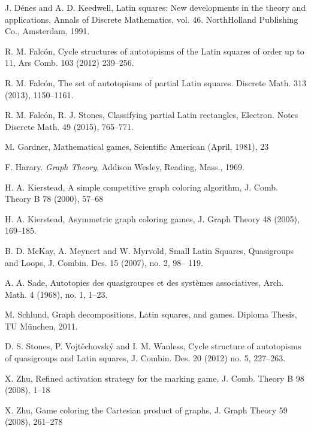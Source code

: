 \documentclass{article}
\begin{document}
\begin{thebibliography}{00}
 J. D{\'e}nes and A. D. Keedwell, Latin squares: New developments in the theory and applications, Annals of Discrete Mathematics, vol. 46. NorthHolland Publishing Co., Amsterdam, 1991.

 R. M. Falc\'on, Cycle structures of autotopisms of the Latin squares of order up to 11, Ars Comb. 103 (2012) 239--256.

 R. M. Falc\'on, The set of autotopisms of partial Latin squares. Discrete Math. 313 (2013), 1150--1161.

 R. M. Falc\'on, R. J. Stones, Classifying partial Latin rectangles, Electron. Notes Discrete Math. 49 (2015), 765--771.

 M. Gardner, Mathematical games, Scientific American (April, 1981), 23

 F. Harary. {\em Graph Theory}, Addison Wesley, Reading, Mass., 1969.

 H. A.  Kierstead, A  simple  competitive  graph  coloring  algorithm, J. Comb. Theory B 78 (2000), 57--68

 H. A. Kierstead, Asymmetric graph coloring games, J. Graph Theory 48 (2005), 169--185.

  B. D. McKay, A. Meynert and W. Myrvold, Small Latin Squares, Quasigroups and Loops, J. Combin. Des. 15 (2007), no. 2, 98-- 119.

 A. A. Sade, Autotopies des quasigroupes et des syst\`emes associatives, Arch. Math. 4 (1968), no. 1, 1--23.

 M. Schlund, Graph decompositions, Latin squares, and games. Diploma Thesis, TU M\"{u}nchen, 2011.

 D. S. Stones, P. Vojt\v{e}chovsk\'y and I. M. Wanless, Cycle structure of autotopisms of quasigroups and Latin squares, J. Combin. Des. 20 (2012) no. 5, 227--263.

 X. Zhu, Refined  activation  strategy  for  the  marking  game, J. Comb. Theory B 98 (2008), 1--18

 X. Zhu, Game  coloring  the  Cartesian  product  of  graphs, J. Graph Theory 59 (2008), 261--278


\end{thebibliography}
\end{document}
